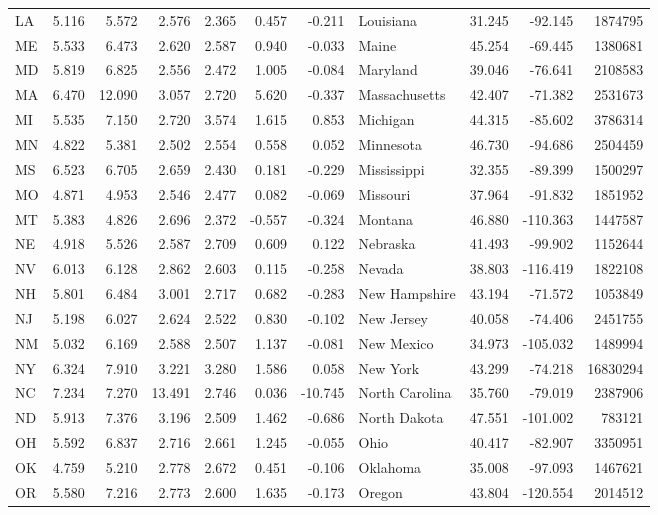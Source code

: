 \begin{tabular}{lrrrrrrlrrr}
LA & 5.116 & 5.572 & 2.576 & 2.365 & 0.457 & -0.211 & Louisiana & 31.245 & -92.145 & 1874795 \\
ME & 5.533 & 6.473 & 2.620 & 2.587 & 0.940 & -0.033 & Maine & 45.254 & -69.445 & 1380681 \\
MD & 5.819 & 6.825 & 2.556 & 2.472 & 1.005 & -0.084 & Maryland & 39.046 & -76.641 & 2108583 \\
MA & 6.470 & 12.090 & 3.057 & 2.720 & 5.620 & -0.337 & Massachusetts & 42.407 & -71.382 & 2531673 \\
MI & 5.535 & 7.150 & 2.720 & 3.574 & 1.615 & 0.853 & Michigan & 44.315 & -85.602 & 3786314 \\
MN & 4.822 & 5.381 & 2.502 & 2.554 & 0.558 & 0.052 & Minnesota & 46.730 & -94.686 & 2504459 \\
MS & 6.523 & 6.705 & 2.659 & 2.430 & 0.181 & -0.229 & Mississippi & 32.355 & -89.399 & 1500297 \\
MO & 4.871 & 4.953 & 2.546 & 2.477 & 0.082 & -0.069 & Missouri & 37.964 & -91.832 & 1851952 \\
MT & 5.383 & 4.826 & 2.696 & 2.372 & -0.557 & -0.324 & Montana & 46.880 & -110.363 & 1447587 \\
NE & 4.918 & 5.526 & 2.587 & 2.709 & 0.609 & 0.122 & Nebraska & 41.493 & -99.902 & 1152644 \\
NV & 6.013 & 6.128 & 2.862 & 2.603 & 0.115 & -0.258 & Nevada & 38.803 & -116.419 & 1822108 \\
NH & 5.801 & 6.484 & 3.001 & 2.717 & 0.682 & -0.283 & New Hampshire & 43.194 & -71.572 & 1053849 \\
NJ & 5.198 & 6.027 & 2.624 & 2.522 & 0.830 & -0.102 & New Jersey & 40.058 & -74.406 & 2451755 \\
NM & 5.032 & 6.169 & 2.588 & 2.507 & 1.137 & -0.081 & New Mexico & 34.973 & -105.032 & 1489994 \\
NY & 6.324 & 7.910 & 3.221 & 3.280 & 1.586 & 0.058 & New York & 43.299 & -74.218 & 16830294 \\
NC & 7.234 & 7.270 & 13.491 & 2.746 & 0.036 & -10.745 & North Carolina & 35.760 & -79.019 & 2387906 \\
ND & 5.913 & 7.376 & 3.196 & 2.509 & 1.462 & -0.686 & North Dakota & 47.551 & -101.002 & 783121 \\
OH & 5.592 & 6.837 & 2.716 & 2.661 & 1.245 & -0.055 & Ohio & 40.417 & -82.907 & 3350951 \\
OK & 4.759 & 5.210 & 2.778 & 2.672 & 0.451 & -0.106 & Oklahoma & 35.008 & -97.093 & 1467621 \\
OR & 5.580 & 7.216 & 2.773 & 2.600 & 1.635 & -0.173 & Oregon & 43.804 & -120.554 & 2014512 \\

\end{tabular}
